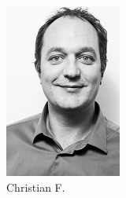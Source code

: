         \begin{figure}[h!]
            \centering
            \begin{subfigure}[b]{0.2\textwidth}
                \includegraphics[width=\textwidth]{images/christian-serieux.png}
                \caption{Christian F.}
                \label{fig:christian}
            \end{subfigure}
            \begin{subfigure}[b]{0.2\textwidth}

\end{subfigure}
\end{figure}
